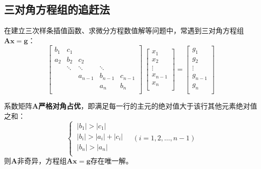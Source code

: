 \subsection{三对角方程组的追赶法}
在建立三次样条插值函数、求微分方程数值解等问题中，常遇到三对角方程组$\boldsymbol{Ax} = \boldsymbol{g}$：
\begin{equation}
    \begin{bmatrix}
        b_1 & c_1       & \       & \      & \       \\
        a_2 & b_2       & c_2     & \      & \       \\
        \   & \ddots    & \ddots  & \ddots & \       \\
        \   & \         & a_{n-1} & b_{n-1}& c_{n-1} \\
        \   & \         & \       & a_{n}  & b_{n}   \\
    \end{bmatrix}\ 
    \begin{bmatrix}
        x_1 \\ x_2 \\ \vdots \\ x_{n-1} \\ x_n \\
    \end{bmatrix} = 
    \begin{bmatrix}
        g_1 \\ g_2 \\ \vdots \\ g_{n-1} \\ g_n \\
    \end{bmatrix}
\end{equation}

系数矩阵$\boldsymbol{A}$\textbf{严格对角占优}，即满足每一行的主元的绝对值大于该行其他元素绝对值之和：
\begin{equation}
    \begin{cases}
        \ \left| b_1 \right| > \left| c_1 \right| \\
        \ \left| b_i \right| > \left| a_i \right| + \left| c_i \right| \\
        \ \left| b_n \right| > \left| a_n \right|  \\
    \end{cases}\quad (i=1,2,\dots,n-1)
\end{equation}
则$\boldsymbol{A}$非奇异，方程组$\boldsymbol{Ax}=\boldsymbol{g}$存在唯一解。

